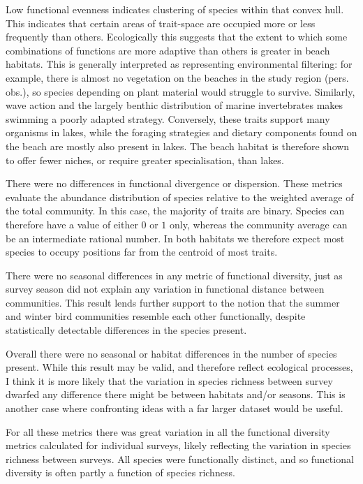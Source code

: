 \documentclass[12pt,a4paper]{book}
\begin{document}
Low functional evenness indicates clustering of species within that convex hull. This indicates that certain areas of trait-space are occupied more or less frequently than others. Ecologically this suggests that the extent to which some combinations of functions are more adaptive than others is greater in beach habitats. This is generally interpreted as representing environmental filtering: for example, there is almost no vegetation on the beaches in the study region (pers. obs.), so species depending on plant material would struggle to survive. Similarly, wave action and the largely benthic distribution of marine invertebrates makes swimming a poorly adapted strategy. Conversely, these traits support many organisms in lakes, while the foraging strategies and dietary components found on the beach are mostly also present in lakes. The beach habitat is therefore shown to offer fewer niches, or require greater specialisation, than lakes.

There were no differences in functional divergence or dispersion. These metrics evaluate the abundance distribution of species relative to the weighted average of the total community. In this case, the majority of traits are binary. Species can therefore have a value of either $0$ or $1$ only, whereas the community average can be an intermediate rational number. In both habitats we therefore expect most species to occupy positions far from the centroid of most traits.

There were no seasonal differences in any metric of functional diversity, just as survey season did not explain any variation in functional distance between communities. This result lends further support to the notion that the summer and winter bird communities resemble each other functionally, despite statistically detectable differences in the species present. 

Overall there were no seasonal or habitat differences in the number of species present. While this result may be valid, and therefore reflect ecological processes, I think it is more likely that the variation in species richness between survey dwarfed any difference there might be between habitats and/or seasons. This is another case where confronting ideas with a far larger dataset would be useful.

For all these metrics there was great variation in all the functional diversity metrics calculated for individual surveys, likely reflecting the variation in species richness between surveys. All species were functionally distinct, and so functional diversity is often partly a function of species richness.
\end{document}
